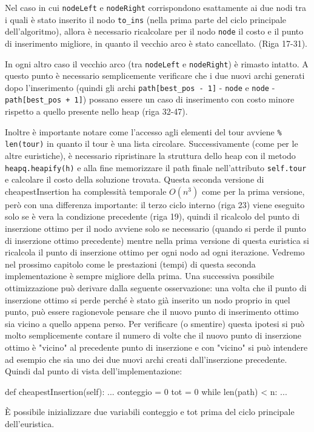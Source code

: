 \documentclass[a4paper,12pt]{report}
\begin{document}
\begin{legal}
  \item Nel caso in cui \lstinline!nodeLeft! e \lstinline!nodeRight! corrispondono esattamente ai due nodi tra i quali è stato inserito il nodo \lstinline!to_ins! (nella prima parte del ciclo principale dell'algoritmo), allora è necessario ricalcolare per il nodo \lstinline!node! il costo e il punto di inserimento migliore, in quanto il vecchio arco è stato cancellato. (Riga 17-31).
  \item In ogni altro caso il vecchio arco (tra \lstinline!nodeLeft! e \lstinline!nodeRight!) è rimasto intatto. A questo punto è necessario semplicemente verificare che i due nuovi archi generati dopo l'inserimento (quindi gli archi \lstinline!path[best_pos - 1]! - \lstinline!node! e \lstinline!node! - \lstinline!path[best_pos + 1]!) possano essere un caso di inserimento con costo minore rispetto a quello presente nello heap (riga 32-47).
\end{legal}
Inoltre è importante notare come l'accesso agli elementi del tour avviene \lstinline!% len(tour)! in quanto il tour è una lista circolare.
Successivamente (come per le altre euristiche), è necessario ripristinare la struttura dello heap con il metodo \lstinline!heapq.heapify(h)! e alla fine memorizzare il path finale nell'attributo \lstinline!self.tour! e calcolare il costo della soluzione trovata. \newline
Questa seconda versione di cheapestInsertion ha complessità temporale $O(n^3)$ come per la prima versione, però con una differenza importante: il terzo ciclo interno (riga 23) viene eseguito solo se è vera la condizione precedente (riga 19), quindi il ricalcolo del punto di inserzione ottimo per il nodo avviene solo se necessario (quando si perde il punto di inserzione ottimo precedente) mentre nella prima versione di questa euristica si ricalcola il punto di inserzione ottimo per ogni nodo ad ogni iterazione. Vedremo nel prossimo capitolo come le prestazioni (tempi) di questa seconda implementazione è sempre migliore della prima. \newline
Una successiva possibile ottimizzazione può derivare dalla seguente osservazione: una volta che il punto di inserzione ottimo si perde perché è stato già inserito un nodo proprio in quel punto, può essere ragionevole pensare che il nuovo punto di inserimento ottimo sia vicino a quello appena perso. Per verificare (o smentire) questa ipotesi si può molto semplicemente contare il numero di volte che il nuovo punto di inserzione ottimo è "vicino" al precedente punto di inserzione e con "vicino" si può intendere ad esempio che sia uno dei due nuovi archi creati dall'inserzione precedente. Quindi dal punto di vista dell'implementazione:
\begin{python}
def cheapestInsertion(self):
  ...
  conteggio = 0
  tot = 0
  while len(path) < n:
    ...
\end{python}
È possibile inizializzare due variabili conteggio e tot prima del ciclo principale dell'euristica.
\end{document}
